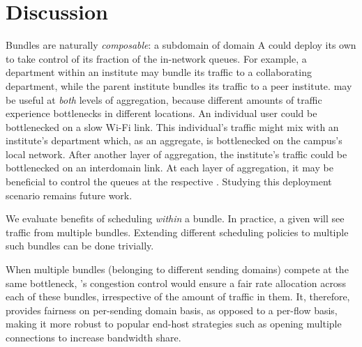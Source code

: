 \section{Discussion}\label{s:discussion}

 Bundles are naturally \emph{composable}: a subdomain of domain A could deploy its own \name to take control of its fraction of the in-network queues. 
For example, a department within an institute may bundle its traffic to a collaborating department, while the parent institute bundles its traffic to a peer institute.
\name may be useful at \emph{both} levels of aggregation, because different amounts of traffic experience bottlenecks in different locations.
An individual user could be bottlenecked on a slow Wi-Fi link. 
This individual's traffic might mix with an institute's department which, as an aggregate, is bottlenecked on the campus's local network.
After another layer of aggregation, the institute's traffic could be bottlenecked on an interdomain link.
At each layer of aggregation, it may be beneficial to control the queues at the respective \name.
Studying this deployment scenario remains future work.

 We evaluate benefits of scheduling \emph{within} a bundle. In practice, a given \inbox will see traffic from multiple bundles. Extending different scheduling policies to multiple such bundles can be done trivially.

 When multiple bundles (belonging to different sending domains) compete at the same bottleneck, \name's congestion control would ensure a fair rate allocation across each of these bundles, irrespective of the amount of traffic in them. It, therefore, provides fairness on per-sending domain basis, as opposed to a per-flow basis, making it more robust to popular end-host strategies such as opening multiple connections to increase bandwidth share. 
